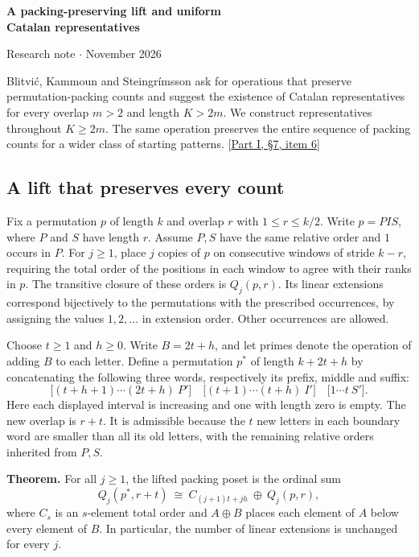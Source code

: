 \documentclass[11pt]{article}
\begin{document}
\begin{center}{\Large\bfseries A packing-preserving lift and uniform\\ Catalan representatives}\par
\small Research note \enspace$\cdot$ November 2026\end{center}

Blitvi\'c, Kammoun and Steingr\'imsson ask for operations that preserve permutation-packing counts and suggest the existence of Catalan representatives for every overlap $m>2$ and length $K>2m$. We construct representatives throughout $K\ge 2m$. The same operation preserves the entire sequence of packing counts for a wider class of starting patterns. [\href{https://arxiv.org/html/2610.29846v1\#S7}{Part I, \S7, item 6}]

\subsection*{A lift that preserves every count}
Fix a permutation $p$ of length $k$ and overlap $r$ with $1\le r\le k/2$. Write $p=PIS$, where $P$ and $S$ have length $r$. Assume $P,S$ have the same relative order and $1$ occurs in $P$. For $j\ge1$, place $j$ copies of $p$ on consecutive windows of stride $k-r$, requiring the total order of the positions in each window to agree with their ranks in $p$. The transitive closure of these orders is $Q_j(p,r)$. Its linear extensions correspond bijectively to the permutations with the prescribed occurrences, by assigning the values $1,2,\ldots$ in extension order. Other occurrences are allowed.

Choose $t\ge1$ and $h\ge0$. Write $B=2t+h$, and let primes denote the operation of adding $B$ to each letter. Define a permutation $p^*$ of length $k+2t+h$ by concatenating the following three words, respectively its prefix, middle and suffix:
\[
 \big[(t+h+1)\cdots(2t+h)\ P'\big]\quad
 \big[(t+1)\cdots(t+h)\ I'\big]\quad
 \big[1\cdots t\ S'\big].
\]
Here each displayed interval is increasing and one with length zero is empty. The new overlap is $r+t$. It is admissible because the $t$ new letters in each boundary word are smaller than all its old letters, with the remaining relative orders inherited from $P,S$.

\textbf{Theorem.} For all $j\ge1$, the lifted packing poset is the ordinal sum
\[
 Q_j(p^*,r+t)\ \cong\ C_{(j+1)t+jh}\ \oplus\ Q_j(p,r),
\]
where $C_s$ is an $s$-element total order and $A\oplus B$ places each element of $A$ below every element of $B$. In particular, the number of linear extensions is unchanged for every $j$.
\end{document}
